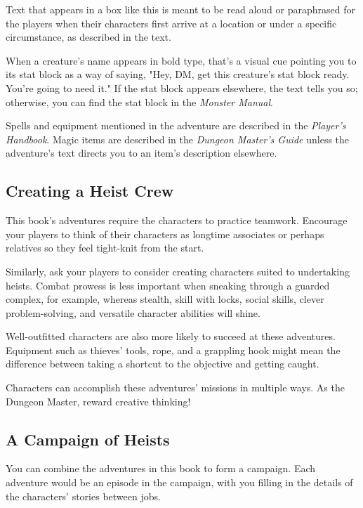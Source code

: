 \documentclass[10pt,a4paper,twoside,bg=print,twocolumn,openany,nodeprecatedcode]{dndbook}
\begin{document}
\begin{DndReadAloud}{}
Text that appears in a box like this is meant to be read aloud or paraphrased for the players when their characters first arrive at a location or under a specific circumstance, as described in the text.

\end{DndReadAloud}

When a creature's name appears in bold type, that's a visual cue pointing you to its stat block as a way of saying, "Hey, DM, get this creature's stat block ready. You're going to need it." If the stat block appears elsewhere, the text tells you so; otherwise, you can find the stat block in the \textit{Monster Manual}.

Spells and equipment mentioned in the adventure are described in the \textit{Player's Handbook}. Magic items are described in the \textit{Dungeon Master's Guide} unless the adventure's text directs you to an item's description elsewhere.

\subsection{Creating a Heist Crew}
This book's adventures require the characters to practice teamwork. Encourage your players to think of their characters as longtime associates or perhaps relatives so they feel tight-knit from the start.

Similarly, ask your players to consider creating characters suited to undertaking heists. Combat prowess is less important when sneaking through a guarded complex, for example, whereas stealth, skill with locks, social skills, clever problem-solving, and versatile character abilities will shine.

Well-outfitted characters are also more likely to succeed at these adventures. Equipment such as thieves' tools, rope, and a grappling hook might mean the difference between taking a shortcut to the objective and getting caught.

Characters can accomplish these adventures' missions in multiple ways. As the Dungeon Master, reward creative thinking!

\subsection{A Campaign of Heists}
You can combine the adventures in this book to form a campaign. Each adventure would be an episode in the campaign, with you filling in the details of the characters' stories between jobs.
\end{document}
